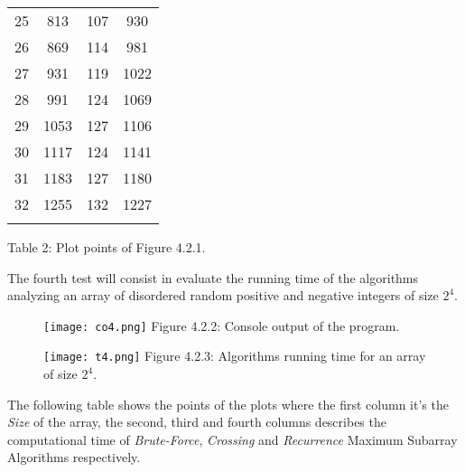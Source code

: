 \begin{center}
\begin{tabular}[.5cm]{ c c c c }
\cmidrule {1-4} 
25 & 813 & 107 & 930 \\ 
\cmidrule {1-4} 
26 & 869 & 114 & 981 \\ 
\cmidrule {1-4} 
27 & 931 & 119 & 1022 \\ 
\cmidrule {1-4} 
28 & 991 & 124 & 1069 \\ 
\cmidrule {1-4} 
29 & 1053 & 127 & 1106 \\ 
\cmidrule {1-4} 
30 & 1117 & 124 & 1141 \\ 
\cmidrule {1-4} 
31 & 1183 & 127 & 1180 \\ 
\cmidrule {1-4} 
32 & 1255 & 132 & 1227 \\ 
\bottomrule 
\linebreak 
\end{tabular} 
\linebreak \linebreak Table 2: Plot points of Figure 4.2.1.
\end{center} \hfill 

\pagebreak

The fourth test will consist in evaluate the running time of the algorithms analyzing an array of disordered random positive and negative integers of size $2^{4}$. \hfill \break

\begin{figure}[H]
\texttt{[image: co4.png]}
\centering \linebreak \linebreak Figure 4.2.2: Console output of the program.
\end{figure} \hfill 

\begin{figure}[H]
\texttt{[image: t4.png]}
\centering \linebreak \linebreak Figure 4.2.3: Algorithms running time for an array of size $2^{4}$.
\end{figure} \hfill 

The following table shows the points of the plots where the first column it's the {\itshape Size} of the array, the second, third and fourth columns describes the computational time of {\itshape Brute-Force}, {\itshape Crossing} and {\itshape Recurrence} Maximum Subarray Algorithms respectively. \hfill \break


